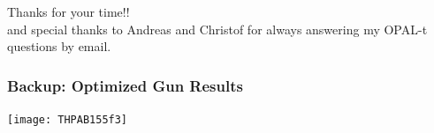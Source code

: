\documentclass{beamer}
\begin{document}
\begin{frame}
	\huge Thanks for your time!!\\ 
	\vskip12pt
	\large and special thanks to Andreas and Christof for always answering my OPAL-t questions by email. 
\end{frame}

\begin{frame}
	\frametitle{Backup: Optimized Gun Results}
	\texttt{[image: THPAB155f3]}
\end{frame}

\end{document}
